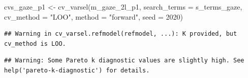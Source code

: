 \documentclass[
]{article}
\newenvironment{Shaded}{\begin{snugshade}}{\end{snugshade}}
\newcommand{\AttributeTok}[1]{\textcolor[rgb]{0.77,0.63,0.00}{#1}}
\newcommand{\DecValTok}[1]{\textcolor[rgb]{0.00,0.00,0.81}{#1}}
\newcommand{\FunctionTok}[1]{\textcolor[rgb]{0.00,0.00,0.00}{#1}}
\newcommand{\NormalTok}[1]{#1}
\newcommand{\OtherTok}[1]{\textcolor[rgb]{0.56,0.35,0.01}{#1}}
\newcommand{\StringTok}[1]{\textcolor[rgb]{0.31,0.60,0.02}{#1}}
\begin{document}
\begin{Shaded}
\begin{Highlighting}[]
\NormalTok{cvs\_gaze\_p1 }\OtherTok{\textless{}{-}} \FunctionTok{cv\_varsel}\NormalTok{(m\_gaze\_2l\_p1, }
                         \AttributeTok{search\_terms =}\NormalTok{ s\_terms\_gaze, }
                         \AttributeTok{cv\_method =} \StringTok{"LOO"}\NormalTok{, }\AttributeTok{method =} \StringTok{"forward"}\NormalTok{, }
                         \AttributeTok{seed =} \DecValTok{2020}\NormalTok{)}
\end{Highlighting}
\end{Shaded}

\begin{verbatim}
## Warning in cv_varsel.refmodel(refmodel, ...): K provided, but cv_method is LOO.
\end{verbatim}

\begin{verbatim}
## Warning: Some Pareto k diagnostic values are slightly high. See help('pareto-k-diagnostic') for details.
\end{verbatim}
\end{document}

